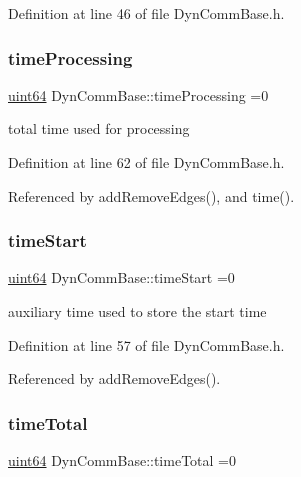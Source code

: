 Definition at line 46 of file Dyn\+Comm\+Base.\+h.

\mbox{\label{classDynCommBase_ae63166e1cbb91574ff23e4c667fad445}} 
\subsubsection{\texorpdfstring{time\+Processing}{timeProcessing}}
{\footnotesize\ttfamily \hyperlink{systemDefines_8h_abc0f5bc07737e498f287334775dff2b6}{uint64} Dyn\+Comm\+Base\+::time\+Processing =0\hspace{0.3cm}{\ttfamily [private]}}

total time used for processing 

Definition at line 62 of file Dyn\+Comm\+Base.\+h.



Referenced by add\+Remove\+Edges(), and time().

\mbox{\label{classDynCommBase_a7795433997aa908ce2b8be2b3f15aba0}} 
\subsubsection{\texorpdfstring{time\+Start}{timeStart}}
{\footnotesize\ttfamily \hyperlink{systemDefines_8h_abc0f5bc07737e498f287334775dff2b6}{uint64} Dyn\+Comm\+Base\+::time\+Start =0\hspace{0.3cm}{\ttfamily [private]}}

auxiliary time used to store the start time 

Definition at line 57 of file Dyn\+Comm\+Base.\+h.



Referenced by add\+Remove\+Edges().

\mbox{\label{classDynCommBase_ac796111a001f3c815d4b72e66da47cc2}} 
\subsubsection{\texorpdfstring{time\+Total}{timeTotal}}
{\footnotesize\ttfamily \hyperlink{systemDefines_8h_abc0f5bc07737e498f287334775dff2b6}{uint64} Dyn\+Comm\+Base\+::time\+Total =0\hspace{0.3cm}{\ttfamily [private]}}

